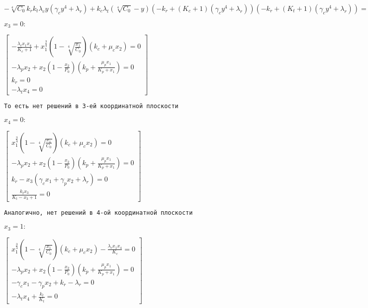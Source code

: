 \documentclass[11pt]{article}
\begin{document}
    $- \sqrt[4]{C_{0}} k_{r} k_{t} \lambda_{c} y \left(\gamma_{c} y^{4} + \lambda_{r}\right) + k_{c} \lambda_{t} \left(\sqrt[4]{C_{0}} - y\right) \left(- k_{r} + \left(K_{c} + 1\right) \left(\gamma_{c} y^{4} + \lambda_{r}\right)\right) \left(- k_{r} + \left(K_{t} + 1\right) \left(\gamma_{c} y^{4} + \lambda_{r}\right)\right) = 0$

    
    $x_3 = 0:$

    
    $\displaystyle \left[\begin{matrix}- \frac{\lambda_{c} x_{1} x_{4}}{K_{c} + 1} + x_{1}^{\frac{3}{4}} \left(1 - \sqrt[4]{\frac{x_{1}}{C_{0}}}\right) \left(k_{c} + \mu_{c} x_{2}\right) = 0\\- \lambda_{p} x_{2} + x_{2} \left(1 - \frac{x_{2}}{P_{0}}\right) \left(k_{p} + \frac{\mu_{p} x_{1}}{K_{p} + x_{1}}\right) = 0\\k_{r} = 0\\- \lambda_{t} x_{4} = 0\end{matrix}\right]$

    
    \begin{Verbatim}[commandchars=\\\{\}]
То есть нет решений в 3-ей координатной плоскости
    \end{Verbatim}

    $x_4 = 0:$

    
    $\displaystyle \left[\begin{matrix}x_{1}^{\frac{3}{4}} \left(1 - \sqrt[4]{\frac{x_{1}}{C_{0}}}\right) \left(k_{c} + \mu_{c} x_{2}\right) = 0\\- \lambda_{p} x_{2} + x_{2} \left(1 - \frac{x_{2}}{P_{0}}\right) \left(k_{p} + \frac{\mu_{p} x_{1}}{K_{p} + x_{1}}\right) = 0\\k_{r} - x_{3} \left(\gamma_{c} x_{1} + \gamma_{p} x_{2} + \lambda_{r}\right) = 0\\\frac{k_{t} x_{3}}{K_{t} - x_{3} + 1} = 0\end{matrix}\right]$

    
    \begin{Verbatim}[commandchars=\\\{\}]
Аналогично, нет решений в 4-ой координатной плоскости
    \end{Verbatim}

    $x_3 = 1:$

    
    $\displaystyle \left[\begin{matrix}x_{1}^{\frac{3}{4}} \left(1 - \sqrt[4]{\frac{x_{1}}{C_{0}}}\right) \left(k_{c} + \mu_{c} x_{2}\right) - \frac{\lambda_{c} x_{1} x_{4}}{K_{c}} = 0\\- \lambda_{p} x_{2} + x_{2} \left(1 - \frac{x_{2}}{P_{0}}\right) \left(k_{p} + \frac{\mu_{p} x_{1}}{K_{p} + x_{1}}\right) = 0\\- \gamma_{c} x_{1} - \gamma_{p} x_{2} + k_{r} - \lambda_{r} = 0\\- \lambda_{t} x_{4} + \frac{k_{t}}{K_{t}} = 0\end{matrix}\right]$
\end{document}
